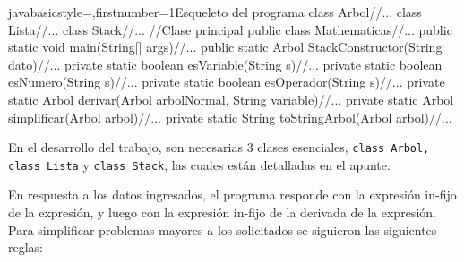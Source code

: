 \documentclass[letterpaper,11pt]{article} %
\begin{document}
\begin{sourcecodep}[\label{codigo}]{java}{basicstyle={\fontsize{9}{10}\selectfont\ttfamily},firstnumber=1}{Esqueleto del programa}
	class Arbol{//...
	}
	class Lista{//...
	}
	class Stack{//...
	}
	//Clase principal
	public class Mathematicas{//...
		public static void main(String[] args){//...
		}
		public static Arbol StackConstructor(String dato){//...
		}
		private static boolean esVariable(String s){//...
		}
		private static boolean esNumero(String s){//...
		}
		private static boolean esOperador(String s){//...
		}
		private static Arbol derivar(Arbol arbolNormal, String variable){//...
		}
		private static Arbol simplificar(Arbol arbol){//...
		}
		private static String toStringArbol(Arbol arbol){//...
		}
	}
\end{sourcecodep}

\newpage
{}
En el desarrollo del trabajo, son necesarias 3 clases esenciales, \texttt{class Arbol, class Lista} y \texttt{class Stack}, las cuales están detalladas en el apunte.
 
\newp En respuesta a los datos ingresados, el programa responde con la expresión in-fijo de la expresión, y luego con la expresión in-fijo de la derivada de la expresión. Para simplificar problemas mayores a los solicitados se siguieron las siguientes reglas:
\end{document}
